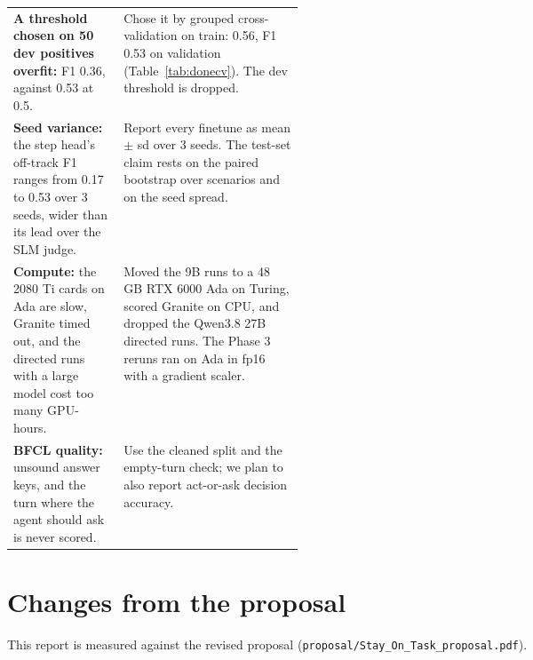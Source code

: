 \documentclass[10.5pt,a4paper]{article}
\newcommand{\code}[1]{\texttt{#1}}
\begin{document}
\begin{table}[H]
\begin{tabularx}{\linewidth}{P{0.38\linewidth}Y}
\textbf{A threshold chosen on 50 dev positives overfit:} F1 0.36, against 0.53 at 0.5. & Chose it by grouped cross-validation on train: 0.56, F1 0.53 on validation (Table~\ref{tab:donecv}). The dev threshold is dropped. \\
\textbf{Seed variance:} the step head's off-track F1 ranges from 0.17 to 0.53 over 3 seeds, wider than its lead over the SLM judge. & Report every finetune as mean $\pm$ sd over 3 seeds. The test-set claim rests on the paired bootstrap over scenarios and on the seed spread. \\
\textbf{Compute:} the 2080 Ti cards on Ada are slow, Granite timed out, and the directed runs with a large model cost too many GPU-hours. & Moved the 9B runs to a 48 GB RTX 6000 Ada on Turing, scored Granite on CPU, and dropped the Qwen3.8 27B directed runs. The Phase 3 reruns ran on Ada in fp16 with a gradient scaler. \\
\textbf{BFCL quality:} unsound answer keys, and the turn where the agent should ask is never scored. & Use the cleaned split and the empty-turn check; we plan to also report act-or-ask decision accuracy. \\
\bottomrule
\end{tabularx}
\end{table}

\section{Changes from the proposal}\label{sec:changes}
This report is measured against the revised proposal (\code{proposal/Stay\_On\_Task\_proposal.pdf}).
\end{document}
